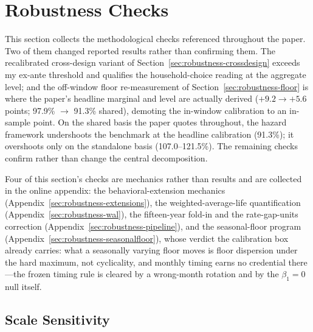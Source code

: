 \documentclass[12pt]{article}
\begin{document}
\section{Robustness Checks}\label{sec:robustness}

This section collects the methodological checks referenced throughout the paper. Two of them changed reported results rather than confirming them. The recalibrated cross-design variant of Section~\ref{sec:robustness-crossdesign} exceeds my ex-ante threshold and qualifies the household-choice reading at the aggregate level; and the off-window floor re-measurement of Section~\ref{sec:robustness-floor} is where the paper's headline marginal and level are actually derived ($+9.2 \to +5.6$ points; 97.9\% $\to$ 91.3\% shared), demoting the in-window calibration to an in-sample point. On the shared basis the paper quotes throughout, the hazard framework undershoots the benchmark at the headline calibration (91.3\%); it overshoots only on the standalone basis (107.0--121.5\%). The remaining checks confirm rather than change the central decomposition.

Four of this section's checks are mechanics rather than results and are collected in the online appendix: the behavioral-extension mechanics (Appendix~\ref{sec:robustness-extensions}), the weighted-average-life quantification (Appendix~\ref{sec:robustness-wal}), the fifteen-year fold-in and the rate-gap-units correction (Appendix~\ref{sec:robustness-pipeline}), and the seasonal-floor program (Appendix~\ref{sec:robustness-seasonalfloor}), whose verdict the calibration box already carries: what a seasonally varying floor moves is floor dispersion under the hard maximum, not cyclicality, and monthly timing earns no credential there---the frozen timing rule is cleared by a wrong-month rotation and by the $\beta_1 = 0$ null itself.

\subsection{Scale Sensitivity}\label{sec:robustness-scale}
\end{document}
